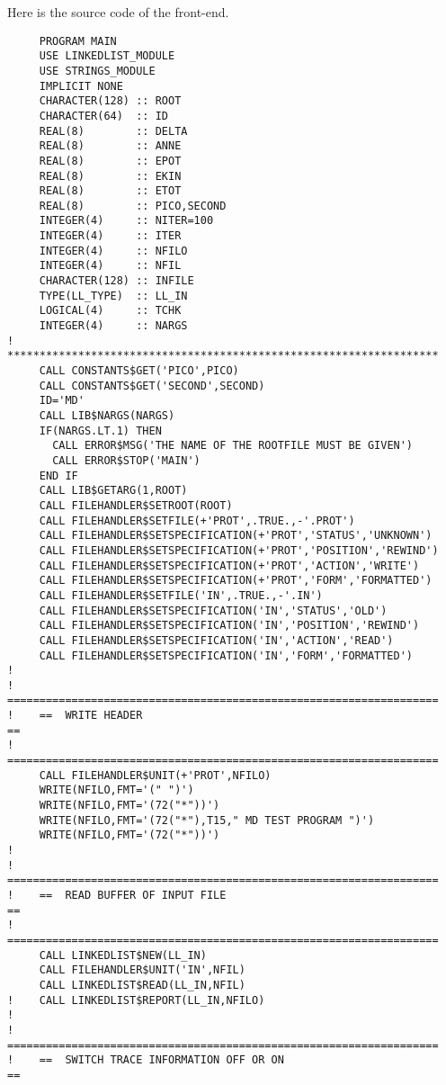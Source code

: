 \documentclass[11pt,a4paper]{report}
\begin{document}
Here is the source code of the front-end.
\begin{verbatim} 
     PROGRAM MAIN
     USE LINKEDLIST_MODULE
     USE STRINGS_MODULE
     IMPLICIT NONE
     CHARACTER(128) :: ROOT
     CHARACTER(64)  :: ID
     REAL(8)        :: DELTA
     REAL(8)        :: ANNE
     REAL(8)        :: EPOT
     REAL(8)        :: EKIN
     REAL(8)        :: ETOT
     REAL(8)        :: PICO,SECOND
     INTEGER(4)     :: NITER=100
     INTEGER(4)     :: ITER
     INTEGER(4)     :: NFILO
     INTEGER(4)     :: NFIL
     CHARACTER(128) :: INFILE
     TYPE(LL_TYPE)  :: LL_IN
     LOGICAL(4)     :: TCHK
     INTEGER(4)     :: NARGS
!    *******************************************************************
     CALL CONSTANTS$GET('PICO',PICO)
     CALL CONSTANTS$GET('SECOND',SECOND)
     ID='MD'    
     CALL LIB$NARGS(NARGS)
     IF(NARGS.LT.1) THEN
       CALL ERROR$MSG('THE NAME OF THE ROOTFILE MUST BE GIVEN')
       CALL ERROR$STOP('MAIN')
     END IF
     CALL LIB$GETARG(1,ROOT)
     CALL FILEHANDLER$SETROOT(ROOT)
     CALL FILEHANDLER$SETFILE(+'PROT',.TRUE.,-'.PROT')
     CALL FILEHANDLER$SETSPECIFICATION(+'PROT','STATUS','UNKNOWN')
     CALL FILEHANDLER$SETSPECIFICATION(+'PROT','POSITION','REWIND')
     CALL FILEHANDLER$SETSPECIFICATION(+'PROT','ACTION','WRITE')
     CALL FILEHANDLER$SETSPECIFICATION(+'PROT','FORM','FORMATTED')
     CALL FILEHANDLER$SETFILE('IN',.TRUE.,-'.IN')
     CALL FILEHANDLER$SETSPECIFICATION('IN','STATUS','OLD')
     CALL FILEHANDLER$SETSPECIFICATION('IN','POSITION','REWIND')
     CALL FILEHANDLER$SETSPECIFICATION('IN','ACTION','READ')
     CALL FILEHANDLER$SETSPECIFICATION('IN','FORM','FORMATTED')
!
!    ===================================================================
!    ==  WRITE HEADER                                                 ==
!    ===================================================================
     CALL FILEHANDLER$UNIT(+'PROT',NFILO)
     WRITE(NFILO,FMT='(" ")')
     WRITE(NFILO,FMT='(72("*"))')
     WRITE(NFILO,FMT='(72("*"),T15," MD TEST PROGRAM ")')
     WRITE(NFILO,FMT='(72("*"))')
!
!    ===================================================================
!    ==  READ BUFFER OF INPUT FILE                                    ==
!    ===================================================================
     CALL LINKEDLIST$NEW(LL_IN)
     CALL FILEHANDLER$UNIT('IN',NFIL)
     CALL LINKEDLIST$READ(LL_IN,NFIL)
!    CALL LINKEDLIST$REPORT(LL_IN,NFILO)
!
!    ===================================================================
!    ==  SWITCH TRACE INFORMATION OFF OR ON                           ==

\end{verbatim}
\end{document}
